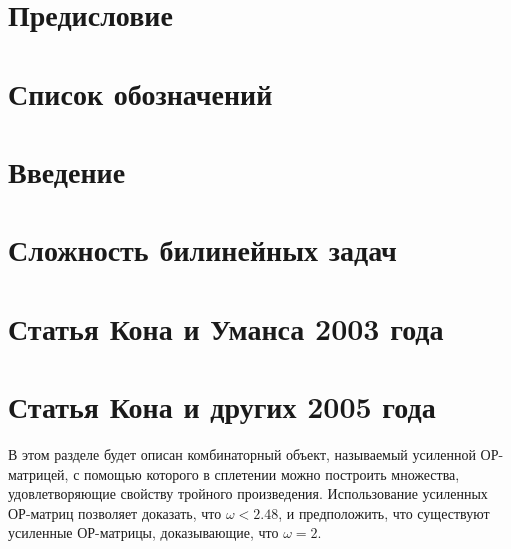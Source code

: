 \documentclass[11pt,a4paper,twoside]{report}
\numberwithin{equation}{section}
\theoremstyle{definition}
\theoremstyle{remark}
\begin{document}
	
	
	\tableofcontents 
	\clearpage
	
	\chapter*{Предисловие}
	
		
	\chapter*{Список обозначений}
	
	
	\chapter*{Введение}
	
	
	\chapter{Сложность билинейных задач}
	
	
	
	
	
	
	
	
	
	
	\chapter{Статья Кона и Уманса 2003 года \cite{Cohn03}}
	
	
	
	\chapter{Статья Кона и других 2005 года \cite{Cohn05}}
В этом разделе будет описан комбинаторный объект, называемый усиленной ОР-матрицей, с помощью которого в сплетении можно построить множества, удовлетворяющие свойству тройного произведения. Использование усиленных ОР-матриц позволяет доказать, что $\omega < 2.48$, и предположить, что существуют усиленные ОР-матрицы, доказывающие, что $\omega = 2$.
	
	
	
	
	
	
	
	
	
	
\end{document}
